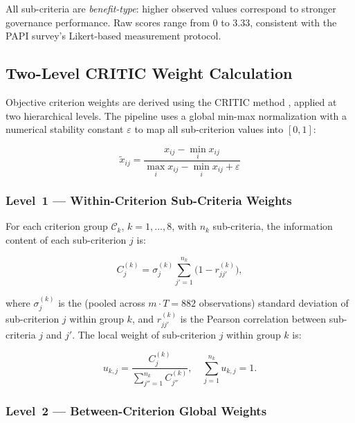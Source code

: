 \documentclass[12pt, a4paper]{article}
\begin{document}
All sub-criteria are \emph{benefit-type}: higher observed values correspond to
stronger governance performance. Raw scores range from 0 to 3.33, consistent
with the PAPI survey's Likert-based measurement protocol.

\subsection{Two-Level CRITIC Weight Calculation}

Objective criterion weights are derived using the CRITIC method
\citep{Diakoulaki1995}, applied at two hierarchical levels.  The pipeline uses
a global min-max normalization with a numerical stability constant $\varepsilon$
to map all sub-criterion values into $[0,1]$:

\begin{equation}
  \tilde{x}_{ij} = \frac{x_{ij} - \min_i x_{ij}}{\max_i x_{ij} - \min_i x_{ij} + \varepsilon}
  \label{eq:minmax}
\end{equation}

\subsubsection{Level~1 --- Within-Criterion Sub-Criteria Weights}

For each criterion group $\mathcal{C}_k$, $k = 1,\ldots,8$, with $n_k$
sub-criteria, the information content of each sub-criterion $j$ is:

\begin{equation}
  C_j^{(k)} = \sigma_j^{(k)} \sum_{j'=1}^{n_k} \bigl(1 - r_{jj'}^{(k)}\bigr),
  \label{eq:critic}
\end{equation}

where $\sigma_j^{(k)}$ is the (pooled across $m \cdot T = 882$ observations)
standard deviation of sub-criterion $j$ within group $k$, and $r_{jj'}^{(k)}$
is the Pearson correlation between sub-criteria $j$ and $j'$. The local weight
of sub-criterion $j$ within group $k$ is:

\begin{equation}
  u_{k,j} = \frac{C_j^{(k)}}{\displaystyle\sum_{j''=1}^{n_k} C_{j''}^{(k)}},
  \quad \sum_{j=1}^{n_k} u_{k,j} = 1.
  \label{eq:local_weights}
\end{equation}

\subsubsection{Level~2 --- Between-Criterion Global Weights}
\end{document}
